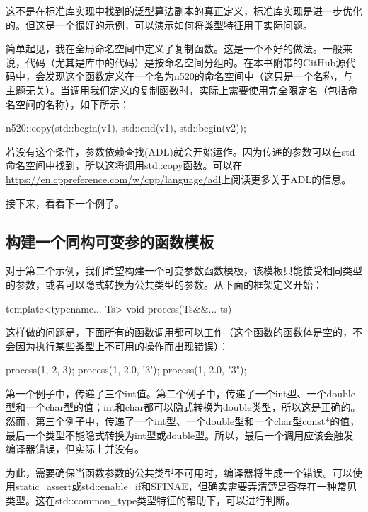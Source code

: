 这不是在标准库实现中找到的泛型算法副本的真正定义，标准库实现是进一步优化的。但这是一个很好的示例，可以演示如何将类型特征用于实际问题。

简单起见，我在全局命名空间中定义了复制函数。这是一个不好的做法。一般来说，代码（尤其是库中的代码）是按命名空间分组的。在本书附带的GitHub源代码中，会发现这个函数定义在一个名为n520的命名空间中（这只是一个名称，与主题无关）。当调用我们定义的复制函数时，实际上需要使用完全限定名（包括命名空间的名称），如下所示：

\begin{cpp}
n520::copy(std::begin(v1), std::end(v1), std::begin(v2));
\end{cpp}

若没有这个条件，参数依赖查找(ADL)就会开始运作。因为传递的参数可以在std命名空间中找到，所以这将调用std::copy函数。可以在\url{https://en.cppreference.com/w/cpp/language/adl}上阅读更多关于ADL的信息。

接下来，看看下一个例子。

\subsection{构建一个同构可变参的函数模板}

对于第二个示例，我们希望构建一个可变参数函数模板，该模板只能接受相同类型的参数，或者可以隐式转换为公共类型的参数。从下面的框架定义开始：

\begin{cpp}
template<typename... Ts>
void process(Ts&&... ts) {}
\end{cpp}

这样做的问题是，下面所有的函数调用都可以工作（这个函数的函数体是空的，不会因为执行某些类型上不可用的操作而出现错误）：

\begin{cpp}
process(1, 2, 3);
process(1, 2.0, '3');
process(1, 2.0, "3");
\end{cpp}

第一个例子中，传递了三个int值。第二个例子中，传递了一个int型、一个double型和一个char型的值；int和char都可以隐式转换为double类型，所以这是正确的。然而，第三个例子中，传递了一个int型、一个double型和一个char型const*的值，最后一个类型不能隐式转换为int型或double型。所以，最后一个调用应该会触发编译器错误，但实际上并没有。

为此，需要确保当函数参数的公共类型不可用时，编译器将生成一个错误。可以使用static\_assert或std::enable\_if和SFINAE，但确实需要弄清楚是否存在一种常见类型。这在std::common\_type类型特征的帮助下，可以进行判断。


